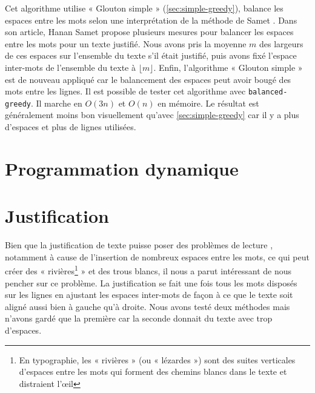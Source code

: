\documentclass[a4paper, 11pt]{article}
\begin{document}
Cet algorithme utilise « Glouton simple » (\ref{sec:simple-greedy}), balance les
espaces entre les mots selon une interprétation de la méthode de Samet
\cite{Samet82}. Dans son article, Hanan Samet propose plusieurs mesures pour
balancer les espaces entre les mots pour un texte justifié. Nous avons pris la
moyenne $m$ des largeurs de ces espaces sur l'ensemble du texte s'il était
justifié, puis avons fixé l'espace inter-mots de l'ensemble du texte à
$\lfloor m \rfloor$. Enfin, l'algorithme « Glouton simple » est de nouveau
appliqué car le balancement des espaces peut avoir bougé des mots entre les
lignes. Il est possible de tester cet algorithme avec \verb|balanced-greedy|. Il
marche en $O(3n)$ et $O(n)$ en mémoire. Le résultat est généralement moins bon
visuellement qu'avec \ref{sec:simple-greedy} car il y a plus d'espaces et plus
de lignes utilisées.

\section{Programmation dynamique}



\section{Justification}
\label{sec:justification}

Bien que la justification de texte puisse poser des problèmes de lecture
\cite{Van96cognitive}, notamment à cause de l'insertion de nombreux espaces
entre les mots, ce qui peut créer des « rivières\footnote{En typographie, les
« rivières » (ou « lézardes ») sont des suites verticales d'espaces entre les
mots qui forment des chemins blancs dans le texte et distraient
l'œil\cite{Harkins12fr}} » et des trous blancs, il nous a parut intéressant de
nous pencher sur ce problème. La justification se fait une fois tous les mots
disposés sur les lignes en ajustant les espaces inter-mots de façon à ce que le
texte soit aligné aussi bien à gauche qu'à droite. Nous avons testé deux
méthodes mais n'avons gardé que la première car la seconde donnait du texte avec
trop d'espaces.
\end{document}
